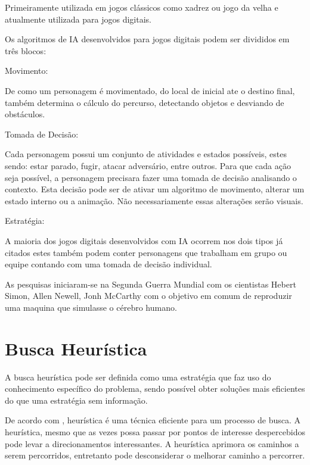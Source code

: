 Primeiramente utilizada em jogos clássicos como xadrez ou jogo da velha e atualmente utilizada para jogos digitais.


Os algoritmos de IA desenvolvidos para jogos digitais podem ser divididos em três blocos:

\begin{alineascomponto}
	
\item Movimento:

De como um personagem é movimentado, do local de inicial ate o destino final, também determina o cálculo do percurso, detectando objetos e desviando de obstáculos.
   
 \item Tomada de Decisão:
 
Cada personagem possui um conjunto de atividades e estados possíveis, estes sendo: estar parado, fugir, atacar adversário, entre outros. Para que cada ação seja possível, a personagem precisara fazer uma tomada de decisão analisando o contexto. Esta decisão pode ser de ativar um algoritmo de movimento, alterar um estado interno ou a animação. Não necessariamente essas alterações serão visuais.

\item Estratégia:

A maioria dos jogos digitais desenvolvidos com IA ocorrem nos dois tipos já citados estes também podem conter personagens que trabalham em grupo ou equipe contando com uma tomada de decisão individual.

	\end{alineascomponto}

	
As pesquisas iniciaram-se na Segunda Guerra Mundial com os cientistas Hebert Simon, Allen Newell,  Jonh McCarthy com o objetivo em comum de reproduzir uma maquina que simulasse o cérebro humano. \cite{ia}

\section{Busca Heurística}
\label{sec:Busca-Heurística}

A busca heurística pode ser definida como uma estratégia que faz uso do conhecimento específico do problema, sendo possível obter soluções mais eficientes do que uma estratégia sem informação. \cite{rus}

De acordo com \cite{el}, heurística é uma técnica eficiente para um processo de busca. A heurística, mesmo que as vezes possa passar por pontos de interesse despercebidos pode levar a direcionamentos interessantes. A heurística aprimora os caminhos a serem percorridos, entretanto pode desconsiderar o melhorar caminho a percorrer. 

